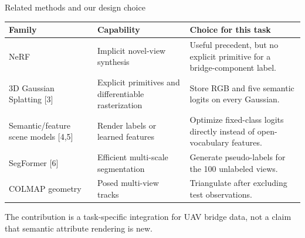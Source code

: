 \documentclass[aspectratio=169,10pt]{beamer}
\begin{document}
\begin{frame}{Related methods and our design choice}
\footnotesize\begin{tabular}{>{\raggedright\arraybackslash}p{}>{\raggedright\arraybackslash}p{}>{\raggedright\arraybackslash}p{}}\toprule
Family & Capability & Choice for this task\\\midrule
NeRF & Implicit novel-view synthesis & Useful precedent, but no explicit primitive for a bridge-component label.\\
3D Gaussian Splatting \textup{[3]} & Explicit primitives and differentiable rasterization & Store RGB and five semantic logits on every Gaussian.\\
Semantic/feature scene models \textup{[4,5]} & Render labels or learned features & Optimize fixed-class logits directly instead of open-vocabulary features.\\
SegFormer \textup{[6]} & Efficient multi-scale segmentation & Generate pseudo-labels for the 100 unlabeled views.\\
COLMAP geometry & Posed multi-view tracks & Triangulate after excluding test observations.\\\bottomrule
\end{tabular}
\vspace{.3em}The contribution is a task-specific integration for UAV bridge data, not a claim that semantic attribute rendering is new.
\end{frame}
\end{document}
